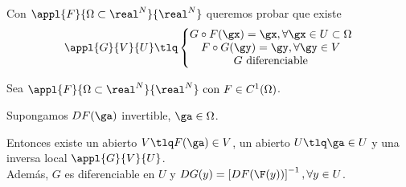 \documentclass{apuntes}
\begin{document}
Con $\appl{F}{\Omega\subset \real^N}{\real^N}$ queremos probar que existe $$\appl{G}{V}{U} \tlq \left\{\begin{matrix} G\circ F(\gx) = \gx, \forall\gx\in U \subset \Omega\\
F\circ G(\gy) = \gy, \forall \gy \in V\\
G \text{ diferenciable} \end{matrix}\right.$$

\begin{theorem} 
Sea $\appl{F}{\Omega\subset\real^N}{\real^N} \text{ con } F\in C^1(\Omega)$.

Supongamos $DF(\ga)$ invertible, $\ga \in \Omega$.

Entonces existe un abierto $V \tlq F(\ga)\in V$, un abierto $U \tlq \ga \in U$ y una inversa local $\appl{G}{V}{U}$.\\
Además, $G$ es diferenciable en $U$ y $DG(y) = \left[DF(\F(y))\right]^{-1}, \forall y \in U$.
\end{theorem}
\end{document}
